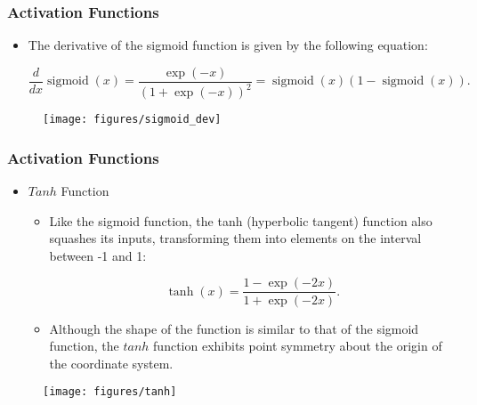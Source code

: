 \documentclass[
  shownotes,
  xcolor={svgnames},
  hyperref={colorlinks,citecolor=DarkBlue,linkcolor=DarkRed,urlcolor=DarkBlue}
  , aspectratio=169]{beamer}
\begin{document}
\begin{frame}
\frametitle{Activation Functions}

\begin{itemize}
\item The derivative of the sigmoid function is given by the following equation:

$$\frac{d}{dx} \operatorname{sigmoid}(x) = \frac{\exp(-x)}{(1 + \exp(-x))^2} = \operatorname{sigmoid}(x)\left(1-\operatorname{sigmoid}(x)\right).$$

\end{itemize}




  \begin{figure}[H] \centering
            \captionsetup{justification=centering}
              \texttt{[image: figures/sigmoid\_dev]}
              
 \end{figure}

\end{frame}

\begin{frame}
\frametitle{Activation Functions}




\begin{itemize}
    
\item $Tanh$ Function
  \begin{itemize}
        \item Like the sigmoid function, the tanh (hyperbolic tangent) function also squashes its inputs, transforming them into elements on the interval between -1 and 1:

        $$\operatorname{tanh}(x) = \frac{1 - \exp(-2x)}{1 + \exp(-2x)}.$$

        \item Although the shape of the function is similar to that of the sigmoid function, the $tanh$ function exhibits point symmetry about the origin of the coordinate system.
    \end{itemize}
\end{itemize}

  \begin{figure}[H] \centering
            \captionsetup{justification=centering}
              \texttt{[image: figures/tanh]}
              
 \end{figure}

\end{frame}
\end{document}
